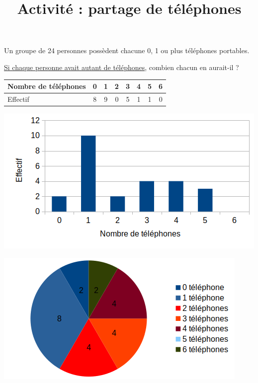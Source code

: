 \documentclass{beamer}
\title{Activité : partage de téléphones}
\author{}
\date{}
\begin{document}
\begin{frame}
	\maketitle
\end{frame}

\begin{frame}
	Un groupe de 24 personnes possèdent chacune 0, 1 ou plus téléphones portables. \vspace{1em}

	\uline{Si chaque personne avait autant de téléphones}, combien chacun en aurait-il ?
\end{frame}

\begin{frame}
	\begin{center}
		\begin{tabular}{|l|c|c|c|c|c|c|c|}
			\hline
			Nombre de téléphones & 0 & 1 & 2 & 3 & 4 & 5 & 6
			\\ \hline
			Effectif             & 8 & 9 & 0 & 5 & 1 & 1 & 0
			\\ \hline
		\end{tabular}
	\end{center}
\end{frame}

\begin{frame}
	\begin{center}
		\includegraphics[width=\textwidth]{Images/Diagramme en barres.png}
	\end{center}
\end{frame}

\begin{frame}
	\begin{center}
		\includegraphics[width=\textwidth]{Images/Diagramme circulaire.png}
	\end{center}
\end{frame}
\end{document}
